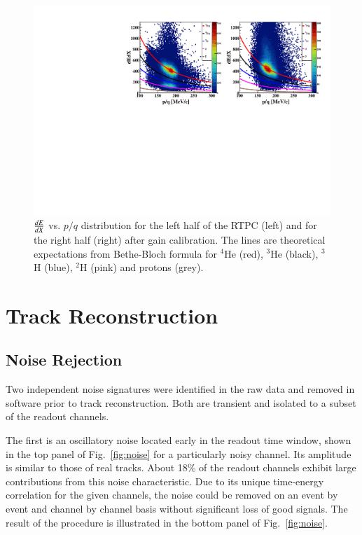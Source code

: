 \documentclass[preprint,5p]{elsarticle}
\begin{document}
\begin{figure}[tb]
\centering
\includegraphics[scale=0.73]{fig_2017/f_dedx_p_exp_2nd.pdf}
\caption{$\small{\frac{dE}{dX}}$ vs. $p/q$ distribution for the left half of 
   the RTPC (left) and for the right half (right) after gain calibration.  
   The lines are theoretical expectations from Bethe-Bloch formula for $^4$He 
   (red), $^3$He (black), $^3$H (blue), $^2$H (pink) and protons (grey).}
\label{fig:dedx_p_exp_2nd}
\end{figure}

\section{Track Reconstruction}
\label{sec_tracking}

\subsection{Noise Rejection}
Two independent noise signatures were identified in the raw data and removed 
in software prior to track reconstruction. Both are transient and isolated to 
a subset of the readout channels. 

The first is an oscillatory noise located early in the readout time window, 
shown in the top panel of Fig.~\ref{fig:noise} for a particularly noisy 
channel. Its amplitude is similar to those of real tracks. About 
18\% of the readout channels exhibit large contributions from this noise 
characteristic. Due to its unique time-energy correlation for the given 
channels, the noise could be removed on an event by event and channel by 
channel basis without significant loss of good signals. The result of the
procedure is illustrated in the bottom panel of Fig.~\ref{fig:noise}.
\end{document}
